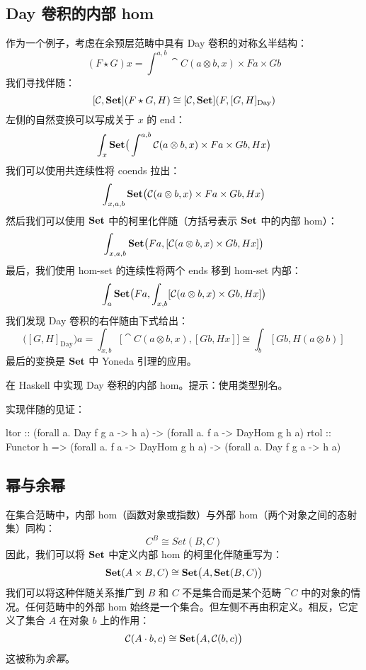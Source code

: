 \documentclass[DaoFP]{subfiles}
\begin{document}
\subsection{Day 卷积的内部 hom}

作为一个例子，考虑在余预层范畴中具有 Day 卷积的对称幺半结构：
\[ (F \star G) x = \int^{a, b} \cat C (a \otimes b, x) \times F a \times G b \]
我们寻找伴随：
\[ [\mathcal{C}, \mathbf{Set}] (F \star G, H) \cong  [\mathcal{C}, \mathbf{Set}] (F, [G, H]_{\text{Day}}) \]
左侧的自然变换可以写成关于 $x$ 的 end：
\[ \int_x \mathbf{Set} \big( \int^{a, b} \mathcal{C} (a \otimes b, x) \times F a \times G b, H x \big) \]
我们可以使用共连续性将 coends 拉出：
\[ \int_{x, a, b} \mathbf{Set} \big( \mathcal{C} (a \otimes b, x) \times F a \times G b, H x \big) \]
然后我们可以使用 $\mathbf{Set}$ 中的柯里化伴随（方括号表示 $\mathbf{Set}$ 中的内部 hom）：
\[ \int_{x, a, b} \mathbf{Set} \big( F a, [\mathcal{C} (a \otimes b, x)  \times G b, H x] \big) \]
最后，我们使用 hom-set 的连续性将两个 ends 移到 hom-set 内部：
\[ \int_{a} \mathbf{Set} \big( F a, \int_{x, b} [\mathcal{C} (a \otimes b, x)  \times G b, H x] \big) \]
我们发现 Day 卷积的右伴随由下式给出：
\[ \big([G, H]_{\text{Day}}\big) a = \int_{x, b} \big[\cat C(a \otimes b, x), [G b, H x]\big] \cong \int_b [G b, H (a \otimes b)]\]
最后的变换是 $\mathbf{Set}$ 中 Yoneda 引理的应用。
\begin{exercise}
在 Haskell 中实现 Day 卷积的内部 hom。提示：使用类型别名。
\end{exercise}
\begin{exercise}
实现伴随的见证：
\begin{haskell}
ltor :: (forall a. Day f g a -> h a) -> (forall a. f a -> DayHom g h a)
rtol :: Functor h => 
  (forall a. f a -> DayHom g h a) -> (forall a. Day f g a -> h a)
\end{haskell}
\end{exercise}

\subsection{幂与余幂}

在集合范畴中，内部 hom（函数对象或指数）与外部 hom（两个对象之间的态射集）同构：
\[ C^B \cong Set(B, C) \]
因此，我们可以将 $\mathbf{Set}$ 中定义内部 hom 的柯里化伴随重写为：
\[ \mathbf{Set} (A \times B, C)  \cong \mathbf{Set} \big(A, \mathbf{Set} (B, C)\big) \]
我们可以将这种伴随关系推广到 $B$ 和 $C$ 不是集合而是某个范畴 $\cat C$ 中的对象的情况。任何范畴中的外部 hom 始终是一个集合。但左侧不再由积定义。相反，它定义了集合 $A$ 在对象 $b$ 上的作用：
\[ \mathcal{C} (A \cdot b, c) \cong \mathbf{Set} \big( A, \mathcal{C} (b, c)\big) \]
这被称为\emph{余幂}。
\end{document}
